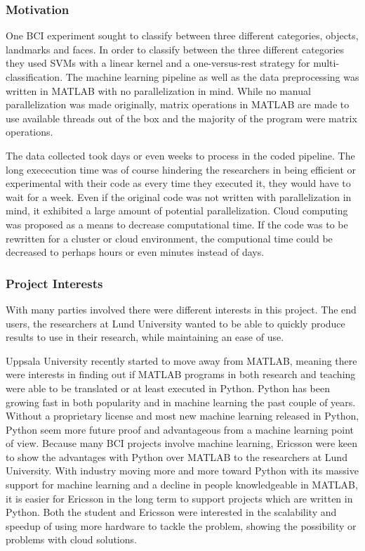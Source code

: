 \documentclass[12pt, a4paper]{article}
\begin{document}
\subsubsection{Motivation}

One BCI experiment sought to classify between three different categories, objects, landmarks and faces.
In order to classify between the three different categories they used SVMs with a linear kernel and a one-versus-rest strategy for multi-classification.
The machine learning pipeline as well as the data preprocessing was written in MATLAB with no parallelization in mind.
While no manual parallelization was made originally, matrix operations in MATLAB are made to use available threads out of the box and the majority of the program were matrix operations.

The data collected took days or even weeks to process in the coded pipeline.
The long exececution time was of course hindering the researchers in being efficient or experimental with their code as every time they executed it, they would have to wait for a week.
Even if the original code was not written with parallelization in mind, it exhibited a large amount of potential parallelization.
Cloud computing was proposed as a means to decrease computational time.
If the code was to be rewritten for a cluster or cloud environment, the computional time could be decreased to perhaps hours or even minutes instead of days.

\subsubsection{Project Interests}

With many parties involved there were different interests in this project.
The end users, the researchers at Lund University wanted to be able to quickly produce results to use in their research, while maintaining an ease of use.

Uppsala University recently started to move away from MATLAB, meaning there were interests in finding out if MATLAB programs in both research and teaching were able to be translated or at least executed in Python.
Python has been growing fast in both popularity and in machine learning the past couple of years.
Without a proprietary license and most new machine learning released in Python, Python seem more future proof and advantageous from a machine learning point of view.
Because many BCI projects involve machine learning, Ericsson were keen to show the advantages with Python over MATLAB to the researchers at Lund University.
With industry moving more and more toward Python with its massive support for machine learning and a decline in people knowledgeable in MATLAB, it is easier for Ericsson in the long term to support projects which are written in Python.
Both the student and Ericsson were interested in the scalability and speedup of using more hardware to tackle the problem, showing the possibility or problems with cloud solutions.
\end{document}
